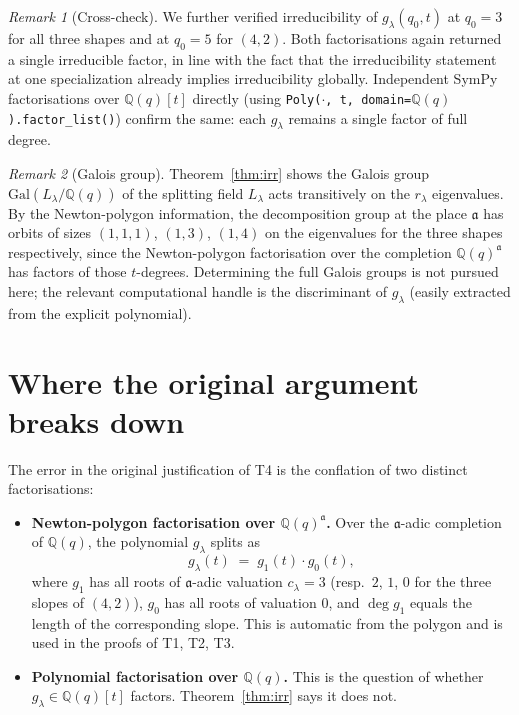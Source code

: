 \documentclass[11pt]{article}
\theoremstyle{remark}
\newtheorem*{remark}{Remark}
\begin{document}
\begin{remark}[Cross-check]
We further verified irreducibility of $g_\lambda(q_0, t)$ at
$q_0 = 3$ for all three shapes and at $q_0 = 5$ for $(4,2)$.
Both factorisations again returned a single irreducible factor, in line
with the fact that the irreducibility statement at one specialization
already implies irreducibility globally. Independent SymPy
factorisations over $\mathbb{Q}(q)[t]$ directly (using
\texttt{Poly($\cdot$, t, domain=$\mathbb{Q}(q)$).factor\_list()})
confirm the same: each $g_\lambda$ remains a single factor of full
degree.
\end{remark}

\begin{remark}[Galois group]
Theorem~\ref{thm:irr} shows the Galois group $\mathrm{Gal}(L_\lambda /
\mathbb{Q}(q))$ of the splitting field $L_\lambda$ acts transitively
on the $r_\lambda$ eigenvalues. By the Newton-polygon information, the
decomposition group at the place $\mathfrak{a}$ has orbits of sizes
$(1,1,1)$, $(1,3)$, $(1,4)$ on the eigenvalues for the three shapes
respectively, since the Newton-polygon factorisation over the
completion $\mathbb{Q}(q)^{\mathfrak{a}}$ has factors of those
$t$-degrees. Determining the full Galois groups is not pursued here;
the relevant computational handle is the discriminant of $g_\lambda$
(easily extracted from the explicit polynomial).
\end{remark}

\section{Where the original argument breaks down}

The error in the original justification of T4 is the conflation of
two distinct factorisations:

\begin{itemize}
\item \textbf{Newton-polygon factorisation over $\mathbb{Q}(q)^\mathfrak{a}$.}
  Over the $\mathfrak{a}$-adic completion of $\mathbb{Q}(q)$, the
  polynomial $g_\lambda$ splits as
  \[
  g_\lambda(t) \;=\; g_1(t) \cdot g_0(t),
  \]
  where $g_1$ has all roots of $\mathfrak{a}$-adic valuation
  $c_\lambda = 3$ (resp.\ $2$, $1$, $0$ for the three slopes of $(4,2)$),
  $g_0$ has all roots of valuation $0$, and $\deg g_1$ equals the
  length of the corresponding slope. This is automatic from the
  polygon and is used in the proofs of T1, T2, T3.

\item \textbf{Polynomial factorisation over $\mathbb{Q}(q)$.}
  This is the question of whether $g_\lambda \in \mathbb{Q}(q)[t]$
  factors. Theorem~\ref{thm:irr} says it does not.
\end{itemize}
\end{document}
